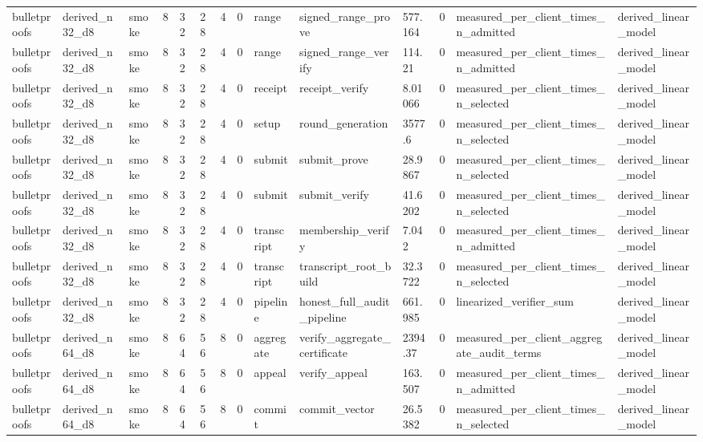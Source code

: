 \begin{table}[t]
\begin{tabular}{llllllllllllll}
bulletproofs & derived\_n32\_d8 & smoke & 8 & 32 & 28 & 4 & 0 & range & signed\_range\_prove & 577.164 & 0 & measured\_per\_client\_times\_n\_admitted & derived\_linear\_model \\
bulletproofs & derived\_n32\_d8 & smoke & 8 & 32 & 28 & 4 & 0 & range & signed\_range\_verify & 114.21 & 0 & measured\_per\_client\_times\_n\_admitted & derived\_linear\_model \\
bulletproofs & derived\_n32\_d8 & smoke & 8 & 32 & 28 & 4 & 0 & receipt & receipt\_verify & 8.01066 & 0 & measured\_per\_client\_times\_n\_selected & derived\_linear\_model \\
bulletproofs & derived\_n32\_d8 & smoke & 8 & 32 & 28 & 4 & 0 & setup & round\_generation & 3577.6 & 0 & measured\_per\_client\_times\_n\_selected & derived\_linear\_model \\
bulletproofs & derived\_n32\_d8 & smoke & 8 & 32 & 28 & 4 & 0 & submit & submit\_prove & 28.9867 & 0 & measured\_per\_client\_times\_n\_selected & derived\_linear\_model \\
bulletproofs & derived\_n32\_d8 & smoke & 8 & 32 & 28 & 4 & 0 & submit & submit\_verify & 41.6202 & 0 & measured\_per\_client\_times\_n\_selected & derived\_linear\_model \\
bulletproofs & derived\_n32\_d8 & smoke & 8 & 32 & 28 & 4 & 0 & transcript & membership\_verify & 7.042 & 0 & measured\_per\_client\_times\_n\_admitted & derived\_linear\_model \\
bulletproofs & derived\_n32\_d8 & smoke & 8 & 32 & 28 & 4 & 0 & transcript & transcript\_root\_build & 32.3722 & 0 & measured\_per\_client\_times\_n\_selected & derived\_linear\_model \\
bulletproofs & derived\_n32\_d8 & smoke & 8 & 32 & 28 & 4 & 0 & pipeline & honest\_full\_audit\_pipeline & 661.985 & 0 & linearized\_verifier\_sum & derived\_linear\_model \\
bulletproofs & derived\_n64\_d8 & smoke & 8 & 64 & 56 & 8 & 0 & aggregate & verify\_aggregate\_certificate & 2394.37 & 0 & measured\_per\_client\_aggregate\_audit\_terms & derived\_linear\_model \\
bulletproofs & derived\_n64\_d8 & smoke & 8 & 64 & 56 & 8 & 0 & appeal & verify\_appeal & 163.507 & 0 & measured\_per\_client\_times\_n\_admitted & derived\_linear\_model \\
bulletproofs & derived\_n64\_d8 & smoke & 8 & 64 & 56 & 8 & 0 & commit & commit\_vector & 26.5382 & 0 & measured\_per\_client\_times\_n\_selected & derived\_linear\_model \\

\end{tabular}
\end{table}
